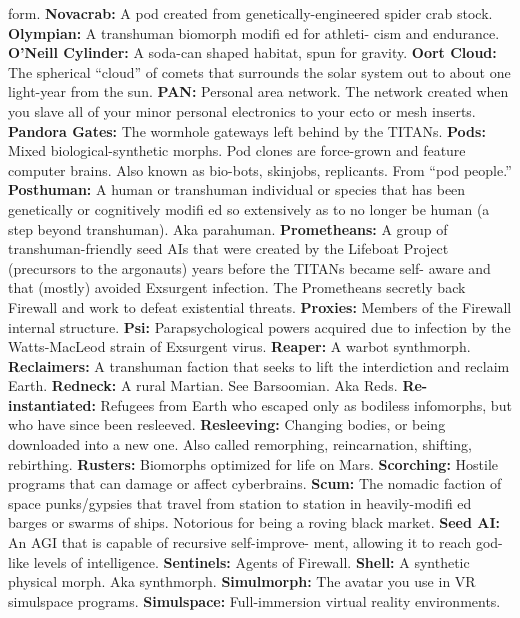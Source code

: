 form.
\textbf{ Novacrab:} A pod created from genetically-engineered 
spider crab stock.
\textbf{ Olympian:} A transhuman biomorph modiﬁ ed for athleti-
cism and endurance.
\textbf{ O'Neill Cylinder:} A soda-can shaped habitat, spun for 
gravity.
\textbf{ Oort Cloud:} The spherical ``cloud'' of comets that 
surrounds the solar system out to about one light-year 
from the sun. 
\textbf{ PAN:} Personal area network. The network created when 
you slave all of your minor personal electronics to your 
ecto or mesh inserts.
\textbf{ Pandora Gates:} The wormhole gateways left behind by 
the TITANs.
\textbf{ Pods:} Mixed biological-synthetic morphs. Pod clones are 
force-grown and feature computer brains. Also known as 
bio-bots, skinjobs, replicants. From ``pod people.''
\textbf{ Posthuman:} A human or transhuman individual or 
species that has been genetically or cognitively modiﬁ ed 
so extensively as to no longer be human (a step beyond 
transhuman). Aka parahuman.
\textbf{ Prometheans:} A group of transhuman-friendly seed AIs 
that were created by the Lifeboat Project (precursors to 
the argonauts) years before the TITANs became self-
aware and that (mostly) avoided Exsurgent infection. The 
Prometheans secretly back Firewall and work to defeat 
existential threats.
\textbf{ Proxies:} Members of the Firewall internal structure.
\textbf{ Psi:} Parapsychological powers acquired due to infection 
by the Watts-MacLeod strain of Exsurgent virus.
\textbf{ Reaper:} A warbot synthmorph.
\textbf{ Reclaimers:} A transhuman faction that seeks to lift the 
interdiction and reclaim Earth.
\textbf{ Redneck:} A rural Martian. See Barsoomian. Aka Reds.
\textbf{ Re-instantiated:} Refugees from Earth who escaped 
only as bodiless infomorphs, but who have since been 
resleeved.
\textbf{ Resleeving:} Changing bodies, or being downloaded into 
a new one. Also called remorphing, reincarnation, shifting, 
rebirthing.
\textbf{ Rusters:} Biomorphs optimized for life on Mars.
\textbf{ Scorching:} Hostile programs that can damage or affect 
cyberbrains.
\textbf{ Scum:} The nomadic faction of space punks/gypsies that 
travel from station to station in heavily-modiﬁ ed barges 
or swarms of ships. Notorious for being a roving black 
market.
\textbf{ Seed AI:} An AGI that is capable of recursive self-improve-
ment, allowing it to reach god-like levels of intelligence.
\textbf{ Sentinels:} Agents of Firewall.
\textbf{ Shell:} A synthetic physical morph. Aka synthmorph.
\textbf{ Simulmorph:} The avatar you use in VR simulspace 
programs.
\textbf{ Simulspace:} Full-immersion virtual reality environments.
